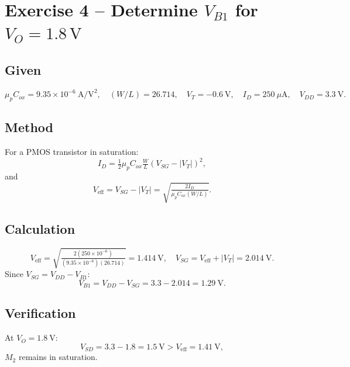 \documentclass[main.tex]{subfiles}
\begin{document}
\section{Exercise 4 – Determine \(V_{B1}\) for \(V_O=1.8\,\mathrm{V}\)}

\subsection*{Given}
\[
\mu_pC_{ox}=9.35\times10^{-6}~\text{A/V}^2,\quad
(W/L)=26.714,\quad
V_T=-0.6~\text{V},\quad
I_D=250~\mu\text{A},\quad
V_{DD}=3.3~\text{V}.
\]

\subsection*{Method}
For a PMOS transistor in saturation:
\begin{equation}
I_D=\tfrac{1}{2}\mu_pC_{ox}\tfrac{W}{L}(V_{SG}-|V_T|)^2,
\label{eq:4.1}
\end{equation}
and
\begin{equation}
V_{\text{eff}}=V_{SG}-|V_T|=\sqrt{\tfrac{2I_D}{\mu_pC_{ox}(W/L)}}.
\label{eq:4.2}
\end{equation}

\subsection*{Calculation}
\[
V_{\text{eff}}=\sqrt{\tfrac{2(250\times10^{-6})}
{(9.35\times10^{-6})(26.714)}}=1.414~\text{V},\quad
V_{SG}=V_{\text{eff}}+|V_T|=2.014~\text{V}.
\]
Since \(V_{SG}=V_{DD}-V_{B1}\):
\[
\boxed{V_{B1}=V_{DD}-V_{SG}=3.3-2.014=1.29~\text{V}.}
\]

\subsection*{Verification}
At \(V_O=1.8~\text{V}\):
\[
V_{SD}=3.3-1.8=1.5~\text{V}>V_{\text{eff}}=1.41~\text{V},
\]
\(M_2\) remains in saturation.
\end{document}
